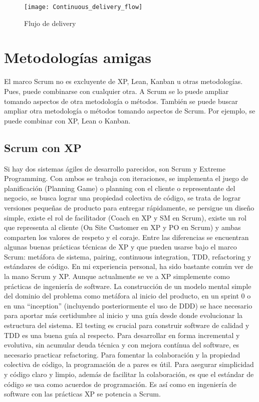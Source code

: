 \begin{figure}[h]
  \centering
  \texttt{[image: Continuous\_delivery\_flow]}
  \caption{Flujo de delivery}
  \centering
  \label{fig:Continuous_delivery_flow} %
\end{figure}

\newpage
\section{Metodologías amigas}

El marco Scrum no es excluyente de XP, Lean, Kanban u otras metodologías. Pues, puede combinarse con cualquier otra. A Scrum se lo puede ampliar tomando aspectos de otra metodología o métodos. También se puede buscar ampliar otra metodología o métodos tomando aspectos de Scrum. Por ejemplo, se puede combinar con XP, Lean o Kanban.

\subsection{Scrum con XP}

Si hay dos sistemas ágiles de desarrollo parecidos, son Scrum y Extreme Programming. Con ambos se trabaja con iteraciones, se implementa el juego de planificación (Planning Game) o planning con el cliente o representante del negocio, se busca lograr una propiedad colectiva de código, se trata de lograr versiones pequeñas de producto para entregar rápidamente, se persigue un diseño simple, existe el rol de facilitador (Coach en XP y SM en Scrum), existe un rol que representa al cliente (On Site Customer en XP y PO en Scrum) y ambas comparten los valores de respeto y el coraje. Entre las diferencias se encuentran algunas buenas prácticas técnicas de XP y que pueden usarse bajo el marco Scrum: metáfora de sistema, pairing, continuous integration, TDD, refactoring y estándares de código. 
En mi experiencia personal, ha sido bastante común ver de la mano Scrum y XP. Aunque actualmente se ve a XP simplemente como prácticas de ingeniería de software. La construcción de un modelo mental simple del dominio del problema como metáfora al inicio del producto, en un sprint 0 o en una “inception” (incluyendo posteriormente el uso de DDD) se hace necesario para aportar más certidumbre al inicio y una guía desde donde evolucionar la estructura del sistema. El testing es crucial para construir software de calidad y TDD es una buena guía al respecto. Para desarrollar en forma incremental y evolutiva, sin acumular deuda técnica y con mejora contínua del software, es necesario practicar refactoring. Para fomentar la colaboración y la propiedad colectiva de código, la programación de a pares es útil. Para asegurar simplicidad y código claro y limpio, además de facilitar la colaboración, es que el estándar de código se usa como acuerdos de programación. Es así como en ingeniería de software con las prácticas XP se potencia a Scrum.

